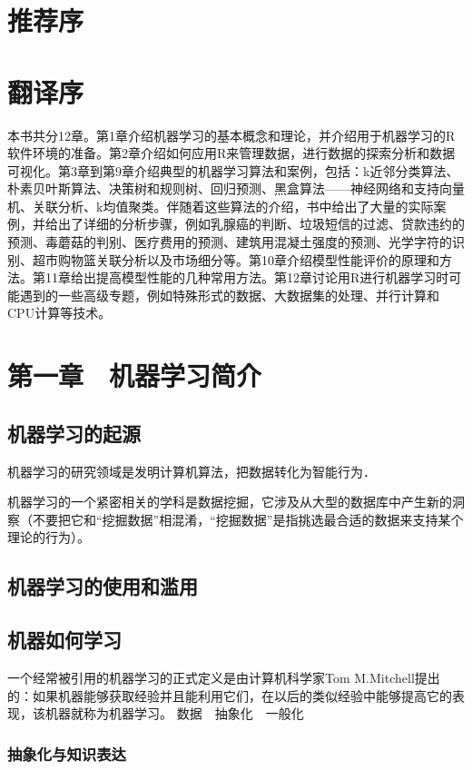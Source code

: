 \documentclass[11pt]{article}
\author{WYZ}
\date{\today}
\title{}
\begin{document}
\tableofcontents

\section{推荐序}
\label{sec:org90ede09}
\section{翻译序}
\label{sec:org3a5acff}
本书共分12章。第1章介绍机器学习的基本概念和理论，并介绍用于机器学习的R软件环境的准备。第2章介绍如何应用R来管理数据，进行数据的探索分析和数据可视化。第3章到第9章介绍典型的机器学习算法和案例，包括：k近邻分类算法、朴素贝叶斯算法、决策树和规则树、回归预测、黑盒算法——神经网络和支持向量机、关联分析、k均值聚类。伴随着这些算法的介绍，书中给出了大量的实际案例，并给出了详细的分析步骤，例如乳腺癌的判断、垃圾短信的过滤、贷款违约的预测、毒蘑菇的判别、医疗费用的预测、建筑用混凝土强度的预测、光学字符的识别、超市购物篮关联分析以及市场细分等。第10章介绍模型性能评价的原理和方法。第11章给出提高模型性能的几种常用方法。第12章讨论用R进行机器学习时可能遇到的一些高级专题，例如特殊形式的数据、大数据集的处理、并行计算和CPU计算等技术。
\section{第一章　机器学习简介}
\label{sec:org0e810cf}
\subsection{机器学习的起源}
\label{sec:org574ca4f}
机器学习的研究领域是发明计算机算法，把数据转化为智能行为．

机器学习的一个紧密相关的学科是数据挖掘，它涉及从大型的数据库中产生新的洞察（不要把它和“挖掘数据”相混淆，“挖掘数据”是指挑选最合适的数据来支持某个理论的行为）。
\subsection{机器学习的使用和滥用}
\label{sec:orgb4c9a85}
\subsection{机器如何学习}
\label{sec:orgf85477f}
一个经常被引用的机器学习的正式定义是由计算机科学家Tom M.Mitchell提出的：如果机器能够获取经验并且能利用它们，在以后的类似经验中能够提高它的表现，该机器就称为机器学习。
数据　抽象化　一般化
\subsubsection{抽象化与知识表达}
\label{sec:org8b96a37}
\end{document}
